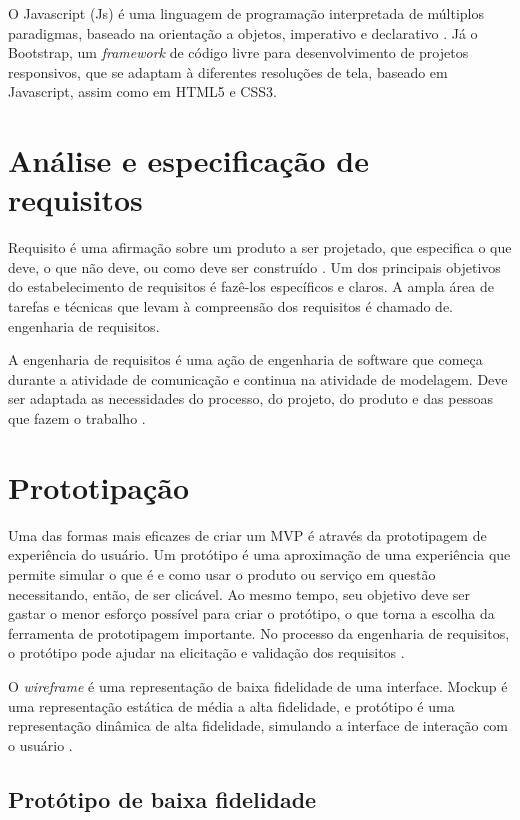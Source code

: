 O Javascript (Js) é uma linguagem de programação interpretada de múltiplos paradigmas,
baseado na orientação a objetos, imperativo e declarativo \cite{javascript}. Já o Bootstrap, um \textit{framework} de código livre para desenvolvimento de projetos responsivos, que se adaptam à diferentes resoluções de tela, baseado em Javascript, assim como em HTML5 e CSS3.


\section{Análise e especificação de requisitos}

Requisito é uma afirmação sobre um produto a ser projetado, que especifica o que deve, o que não deve, ou como deve ser construído \cite{Sommerville:2010:SE:1841764}. Um dos principais objetivos do estabelecimento de requisitos é fazê-los específicos e claros. A ampla área de tarefas e técnicas que levam à compreensão dos requisitos é chamado de. engenharia de requisitos. 

A engenharia de requisitos é uma ação de engenharia de software que começa durante a atividade de comunicação e continua na atividade de modelagem. Deve ser adaptada as necessidades do processo, do projeto, do produto e das pessoas que fazem o trabalho \cite{Pressman:2001:SEP:572512}. 


\section{Prototipação}

Uma das formas mais eficazes de criar um MVP é através da prototipagem de experiência do usuário. Um protótipo é uma aproximação de uma experiência que permite simular o que é e como usar o produto ou serviço em questão necessitando, então, de ser clicável. Ao mesmo tempo, seu objetivo deve ser gastar o menor esforço possível para criar o protótipo, o que torna a escolha da ferramenta de prototipagem importante. No processo da engenharia de requisitos, o protótipo pode ajudar na elicitação e validação dos requisitos \cite{Sommerville:2010:SE:1841764}.

O \textit{wireframe} é uma representação de baixa fidelidade de uma interface. Mockup é uma representação estática de média a alta fidelidade, e protótipo é uma representação dinâmica de alta fidelidade, simulando a interface de interação com o usuário \cite{Sommerville:2010:SE:1841764}.

\subsection{Protótipo de baixa fidelidade}

